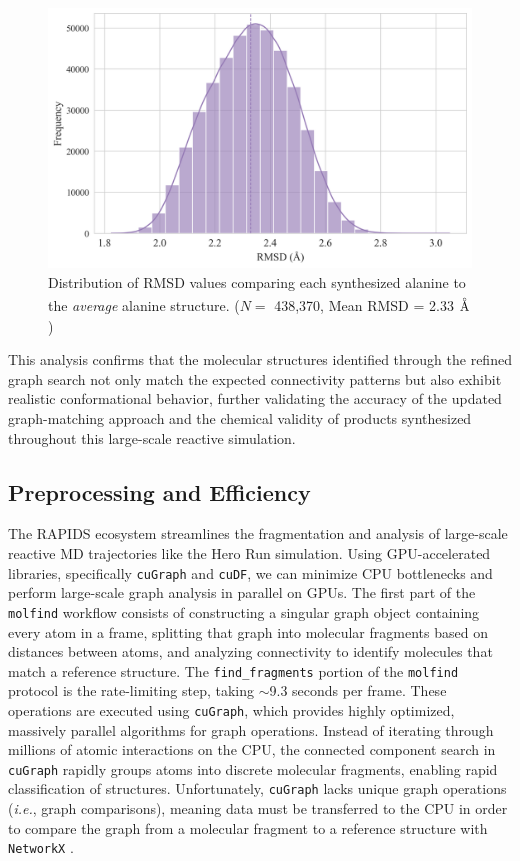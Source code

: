 \begin{figure}[!ht]
    \centering
    \includegraphics[width=1\linewidth]{Images/alanine_dihedral/rmsd_distribution.png}
    \caption[RMSD of synthesized alanine structures]{Distribution of RMSD values comparing each synthesized alanine to the \textit{average} alanine structure. ($N=$ 438,370, Mean RMSD = 2.33 $\angstrom$)}
    \label{fig:ala_rmsd}
\end{figure}

This analysis confirms that the molecular structures identified through the refined graph search not only match the expected connectivity patterns but also exhibit realistic conformational behavior, further validating the accuracy of the updated graph-matching approach and the chemical validity of products synthesized throughout this large-scale reactive simulation.

\subsection{Preprocessing and Efficiency}
\label{subsec:molfind_parallelization}

The RAPIDS ecosystem \cite{rapids} streamlines the fragmentation and analysis of large-scale reactive MD trajectories like the Hero Run simulation.
Using GPU-accelerated libraries, specifically \verb|cuGraph| and \verb|cuDF|, we can minimize CPU bottlenecks and perform large-scale graph analysis in parallel on GPUs. 
The first part of the \verb|molfind| workflow consists of constructing a singular graph object containing every atom in a frame, splitting that graph into molecular fragments based on distances between atoms, and analyzing connectivity to identify molecules that match a reference structure. 
The \verb|find_fragments| portion of the \verb|molfind| protocol is the rate-limiting step, taking $\sim$9.3 seconds per frame. 
These operations are executed using \verb|cuGraph|, which provides highly optimized, massively parallel algorithms for graph operations.
Instead of iterating through millions of atomic interactions on the CPU, the connected component search in \verb|cuGraph| rapidly groups atoms into discrete molecular fragments, enabling rapid classification of structures.
Unfortunately, \verb|cuGraph| lacks unique graph operations (\textit{i.e.}, graph comparisons), meaning data must be transferred to the CPU in order to compare the graph from a molecular fragment to a reference structure with \verb|NetworkX| \cite{networkx}.


